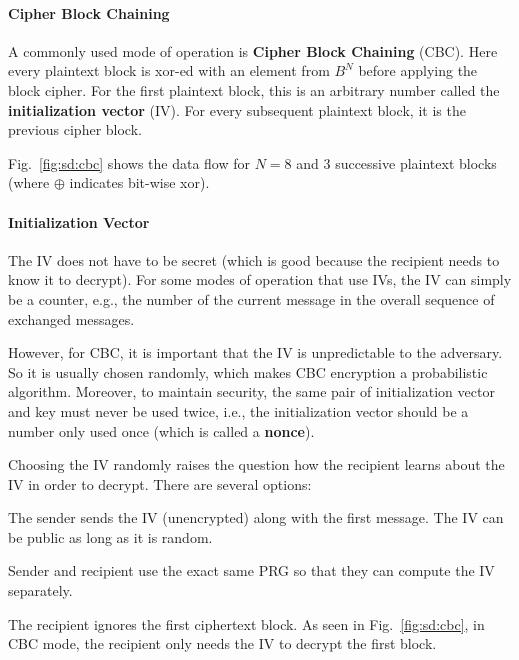 \paragraph{Cipher Block Chaining}
A commonly used mode of operation is \textbf{Cipher Block Chaining} (CBC).
Here every plaintext block is xor-ed with an element from $B^N$ before applying the block cipher.
For the first plaintext block, this is an arbitrary number called the \textbf{initialization vector} (IV).
For every subsequent plaintext block, it is the previous cipher block.

Fig.~\ref{fig:sd:cbc} shows the data flow for $N=8$ and $3$ successive plaintext blocks (where $\oplus$ indicates bit-wise xor).

\paragraph{Initialization Vector}
The IV does not have to be secret (which is good because the recipient needs to know it to decrypt).
For some modes of operation that use IVs, the IV can simply be a counter, e.g., the number of the current message in the overall sequence of exchanged messages.

However, for CBC, it is important that the IV is unpredictable to the adversary.
So it is usually chosen randomly, which makes CBC encryption a probabilistic algorithm.
Moreover, to maintain security, the same pair of initialization vector and key must never be used twice, i.e., the initialization vector should be a number only used once (which is called a \textbf{nonce}).

Choosing the IV randomly raises the question how the recipient learns about the IV in order to decrypt.
There are several options:
\begin{compactitem}
 \item The sender sends the IV (unencrypted) along with the first message. The IV can be public as long as it is random.
 \item Sender and recipient use the exact same PRG so that they can compute the IV separately.
 \item The recipient ignores the first ciphertext block. As seen in Fig.~\ref{fig:sd:cbc}, in CBC mode, the recipient only needs the IV to decrypt the first block.
\end{compactitem}

